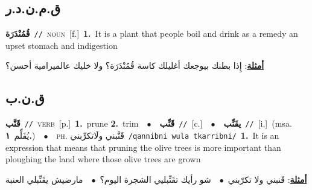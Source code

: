 \documentclass[10pt,a4paper,twoside]{article} %
\begin{document}
\begin{multicols}{2}
\vspace{-3mm}
\subsection*{\color{blue}\foreignlanguage{arabic}{ق.م.ن.د.ر}\color{blue}{ (ntws)}} 

{\setlength\topsep{0pt}\textbf{\foreignlanguage{arabic}{قُمُنْدَرَة}}\ {\color{gray}\texttt{//}\color{black}}\ \textsc{noun}\ [f.]\ \textbf{1.}~It is a plant that people boil and drink as a remedy an upset stomach and indigestion\  \begin{flushright}\color{gray}\foreignlanguage{arabic}{\textbf{\underline{\foreignlanguage{arabic}{أمثلة}}}: إِذا بطنك بيوجعك أغليلك كاسة قُمُنْدَرَة؟ ولا خليك عالميرامية أحسن؟}\end{flushright}\color{black}} \vspace{2mm}

\vspace{-3mm}
\subsection*{\color{blue}\foreignlanguage{arabic}{ق.ن.ب}\color{blue}{}} 

{\setlength\topsep{0pt}\textbf{\foreignlanguage{arabic}{قَنَّب}}\ {\color{gray}\texttt{//}\color{black}}\ \textsc{verb}\ [p.]\ \textbf{1.}~prune  \textbf{2.}~trim\ \ $\bullet$\ \ \setlength\topsep{0pt}\textbf{\foreignlanguage{arabic}{قَنِّب}}\ {\color{gray}\texttt{//}\color{black}}\ [c.]\ \ $\bullet$\ \ \setlength\topsep{0pt}\textbf{\foreignlanguage{arabic}{يقَنِّب}}\ {\color{gray}\texttt{//}\color{black}}\ [i.]\ \color{gray}(msa. \foreignlanguage{arabic}{يُفَلِّم}~\foreignlanguage{arabic}{\textbf{١.}})\color{black}\ \ $\bullet$\ \ \textsc{ph.} \color{gray} \foreignlanguage{arabic}{قَنَّبني ولَاتكرِّبني}\color{black}\ {\color{gray}\texttt{/{\sffamily qannibni wula tkarribni}/}\color{black}}\ \textbf{1.}~It is an expression that means that pruning the olive trees is more important than ploughing the land where those olive trees are grown\  \begin{flushright}\color{gray}\foreignlanguage{arabic}{\textbf{\underline{\foreignlanguage{arabic}{أمثلة}}}: قَنبني ولا تكرّبني\ $\bullet$\ \  شو رأيك تقَنِّبليي الشجرة اليوم؟\ $\bullet$\ \  مارضيش يقَنِّبلي العنبة}\end{flushright}\color{black}} \vspace{2mm}


\end{multicols}
\end{document}
